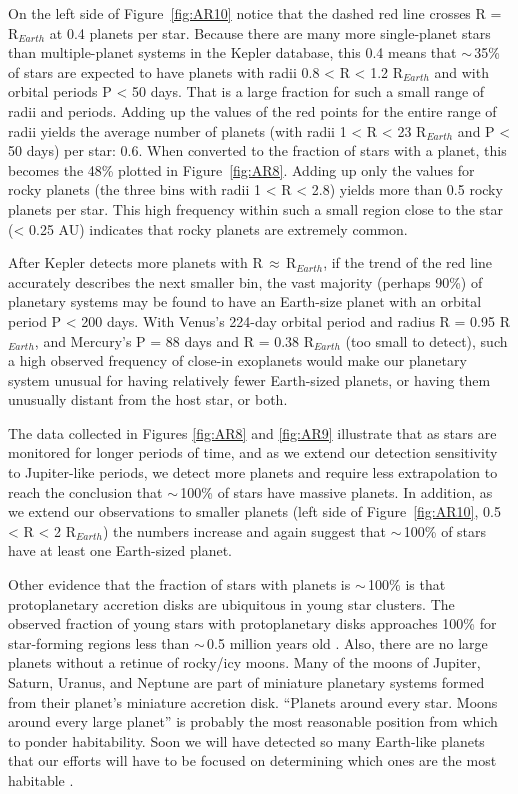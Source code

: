 On the left side of Figure~\ref{fig:AR10} notice that the dashed red line crosses R = R$_{Earth}$ at 0.4 planets per star. Because there are many more single-planet stars than multiple-planet systems in the Kepler database, this 0.4 means that $\sim$\,35\% of stars are expected to have planets with radii 0.8 < R < 1.2 R$_{Earth}$ and with orbital periods P < 50 days. That is a large fraction for such a small range of radii and periods. Adding up the values of the red points for the entire range of radii yields the average number of planets (with radii 1 < R < 23 R$_{Earth}$ and P < 50 days) per star: 0.6. When converted to the fraction of stars with a planet, this becomes the 48\% plotted in Figure~\ref{fig:AR8}. Adding up only the values for rocky planets (the three bins with radii 1 < R < 2.8) yields more than 0.5 rocky planets per star. This high frequency within such a small region close to the star (< 0.25 AU) indicates that rocky planets are extremely common.

After Kepler detects more planets with R\,$\approx$\,R$_{Earth}$, if the trend of the red line accurately describes the next smaller bin, the vast majority (perhaps 90\%) of planetary systems may be found to have an Earth-size planet with an orbital period P < 200 days. With Venus's 224-day orbital period and radius R = 0.95 R$_{Earth}$, and Mercury's P = 88 days and R = 0.38 R$_{Earth}$ (too small to detect), such a high observed frequency of close-in exoplanets would make our planetary system unusual for having relatively fewer Earth-sized planets, or having them unusually distant from the host star, or both.

The data collected in Figures \ref{fig:AR8} and \ref{fig:AR9} illustrate that as stars are monitored for longer periods of time, and as we extend our detection sensitivity to Jupiter-like periods, we detect more planets and require less extrapolation to reach the conclusion that $\sim$\,100\% of stars have massive planets. In addition, as we extend our observations to smaller planets (left side of Figure~\ref{fig:AR10}, 0.5 < R < 2 R$_{Earth}$) the numbers increase and again suggest that $\sim$\,100\% of stars have at least one Earth-sized planet.

Other evidence that the fraction of stars with planets is $\sim$\,100\% is that protoplanetary accretion disks are ubiquitous in young star clusters. The observed fraction of young stars with protoplanetary disks approaches 100\% for star-forming regions less than $\sim$\,0.5 million years old \citep{Mamajek2009,Fedele2010}. Also, there are no large planets without a retinue of rocky/icy moons. Many of the moons of Jupiter, Saturn, Uranus, and Neptune are part of miniature planetary systems formed from their planet's miniature accretion disk. ``Planets around every star. Moons around every large planet'' is probably the most reasonable position from which to ponder habitability. Soon we will have detected so many Earth-like planets that our efforts will have to be focused on determining which ones are the most habitable \citep{Horner2010}.


